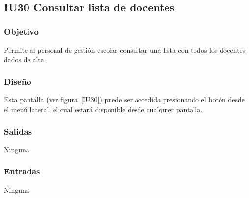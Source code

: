 
\subsection{IU30 Consultar lista de docentes}
\subsubsection{Objetivo}
   Permite al personal de gestión escolar consultar una lista con todos los docentes dados de alta.
\subsubsection{Diseño}
    Esta pantalla  (ver figura~\ref{IU30}) puede ser accedida presionando el botón  desde el menú lateral, el cual estará disponible desde cualquier pantalla.

\subsubsection{Salidas}
Ninguna
\subsubsection{Entradas}
Ninguna
